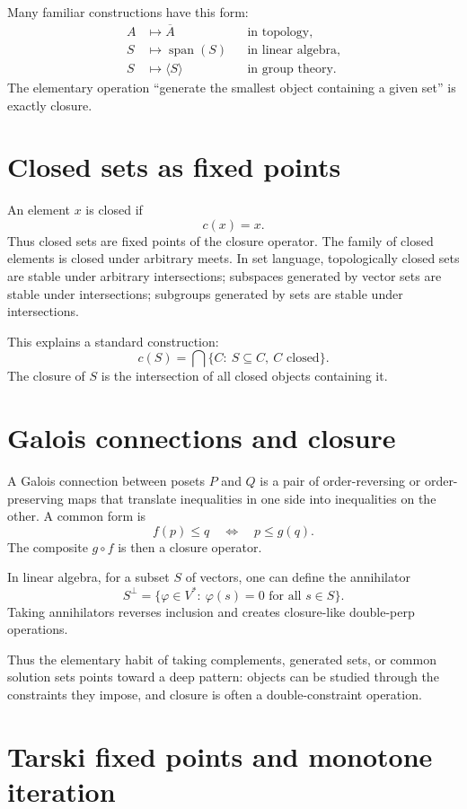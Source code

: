 Many familiar constructions have this form:
\[
\begin{aligned}
  A&\mapsto \overline A &&\text{in topology},\\
  S&\mapsto \operatorname{span}(S) &&\text{in linear algebra},\\
  S&\mapsto \langle S\rangle &&\text{in group theory}.
\end{aligned}
\]
The elementary operation ``generate the smallest object containing a given set'' is exactly closure.

\section{Closed sets as fixed points}

An element $x$ is closed if
\[
  c(x)=x.
\]
Thus closed sets are fixed points of the closure operator.  The family of closed elements is closed under arbitrary meets.  In set language, topologically closed sets are stable under arbitrary intersections; subspaces generated by vector sets are stable under intersections; subgroups generated by sets are stable under intersections.

This explains a standard construction:
\[
  c(S)=\bigcap\{C:\ S\subseteq C,\ C\text{ closed}\}.
\]
The closure of $S$ is the intersection of all closed objects containing it.

\section{Galois connections and closure}

A Galois connection between posets $P$ and $Q$ is a pair of order-reversing or order-preserving maps that translate inequalities in one side into inequalities on the other.  A common form is
\[
  f(p)\le q\quad\Longleftrightarrow\quad p\le g(q).
\]
The composite $g\circ f$ is then a closure operator.

In linear algebra, for a subset $S$ of vectors, one can define the annihilator
\[
  S^\perp=\{\varphi\in V^*:\ \varphi(s)=0\text{ for all }s\in S\}.
\]
Taking annihilators reverses inclusion and creates closure-like double-perp operations.

Thus the elementary habit of taking complements, generated sets, or common solution sets points toward a deep pattern: objects can be studied through the constraints they impose, and closure is often a double-constraint operation.

\section{Tarski fixed points and monotone iteration}

